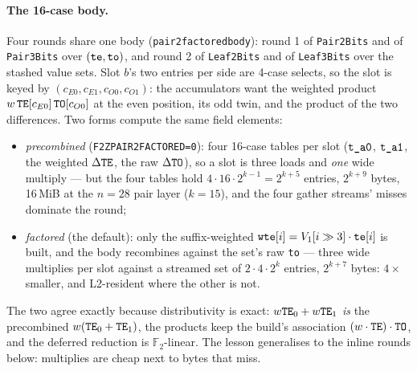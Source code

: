 \documentclass[11pt]{article}
\newcommand{\F}{\mathbb{F}}
\newcommand{\Ftwo}{\F_2}
\newcommand{\code}[1]{{\def\_{\textunderscore\allowbreak}\texttt{#1}}}
\theoremstyle{definition}
\begin{document}
\paragraph{The 16-case body.}
Four rounds share one body (\code{pair2\_factored\_body}): round 1 of
\code{Pair2Bits} and of \code{Pair3Bits} over $(\code{te}, \code{to})$,
and round 2 of \code{Leaf2Bits} and of \code{Leaf3Bits} over the
stashed value sets.  Slot $b$'s two entries per side are 4-case selects, so the slot
is keyed by $(c_{E0}, c_{E1}, c_{O0}, c_{O1})$: the accumulators want
the weighted product $w\,\code{TE}[c_{E0}]\,\code{TO}[c_{O0}]$ at the
even position, its odd twin, and the product of the two differences.
Two forms compute the same field elements:
\begin{itemize}[itemsep=1pt]
\item \emph{precombined} (\code{F2Z\_PAIR2\_FACTORED=0}): four 16-case
  tables per slot ($\code{t\_a0}$, $\code{t\_a1}$, the weighted
  $\Delta\code{TE}$, the raw $\Delta\code{TO}$), so a slot is three
  loads and \emph{one} wide multiply --- but the four tables hold
  $4\cdot16\cdot2^{k-1} = 2^{k+5}$ entries, $2^{k+9}$ bytes, 16\,MiB at
  the $n = 28$ pair layer ($k = 15$), and the four gather streams' misses
  dominate the round;
\item \emph{factored} (the default): only the suffix-weighted
  $\code{wte}[i] = V_1[i \gg 3]\cdot\code{te}[i]$ is built, and the body
  recombines against the set's raw \code{to} --- three wide multiplies
  per slot against a streamed set of $2\cdot4\cdot2^k$ entries,
  $2^{k+7}$ bytes: $4\times$ smaller, and L2-resident where the other
  is not.
\end{itemize}
The two agree exactly because distributivity is exact:
$w\code{TE}_0 + w\code{TE}_1$ \emph{is} the precombined
$w(\code{TE}_0 + \code{TE}_1)$, the products keep the build's
association $(w\cdot\code{TE})\cdot\code{TO}$, and the deferred
reduction is $\Ftwo$-linear.  The lesson generalises to the inline
rounds below: multiplies are cheap next to bytes that miss.
\end{document}
